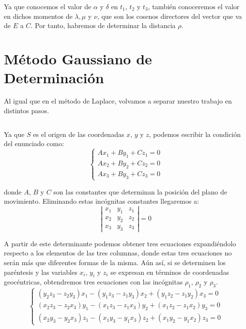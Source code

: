 \documentclass[11pt]{article}
\begin{document}
Ya que conocemos el valor de $\alpha$ y $\delta$ en $t_1$, $t_2$ y $t_3$, también conoceremos el valor en dichos momentos de $\lambda, \mu$ y $\nu$, que son los cosenos directores del vector que va de $E$ a $C$. Por tanto, habremos de determinar la distancia $\rho$.\\










\iffalse



\section{Método Gaussiano de Determinación}
Al igual que en el método de Laplace, volvamos a separar nuestro trabajo en distintos pasos.\\

\subsection{}
Ya que $S$ es el origen de las coordenadas $x$, $y$ y $z$, podemos escribir la condición del enunciado como:
\[
\left\{
\begin{array}{l}
	Ax_1+By_1+Cz_1=0\\
	Ax_2+By_2+Cz_2=0\\
	Ax_3+By_3+Cz_3=0
\end{array}
\right.
\]

\noindent donde $A$, $B$ y $C$ son las constantes que determinan la posición del plano de movimiento. Eliminando estas incógnitas constantes llegaremos a:
\[
\left|
\begin{array}{ccc}
	x_1 & y_1 & z_1\\
	x_2 & y_2 & z_2\\
	x_3 & y_3 & z_3
\end{array}
\right|
=0
\]

A partir de este determinante podemos obtener tres ecuaciones expandiéndolo respecto a los elementos de las tres columnas, donde estas tres ecuaciones no serán más que diferentes formas de la misma. Aún así, si se determinen los paréntesis y las variables $x_i$, $y_i$ y $z_i$ se expresan en términos de coordenadas geocéntricas, obtendremos tres ecuaciones con las incógnitas $\rho_1$, $\rho_2$ y $\rho_3$.
\[
\left\{
\begin{array}{l}
	(y_2z_3-z_2y_3)x_1-(y_1z_3-z_1y_3)x_2+(y_1z_2-z_1y_2)x_3=0\\
	(x_2z_3-z_2x_3)y_1-(x_1z_3-z_1x_3)y_2+(x_1z_2-z_1x_2)y_3=0\\
	(x_2y_3-y_2x_3)z_1-(x_1y_3-y_1x_3)z_2+(x_1y_2-y_1x_2)z_3=0
\end{array}
\right.
\]\\
\end{document}
